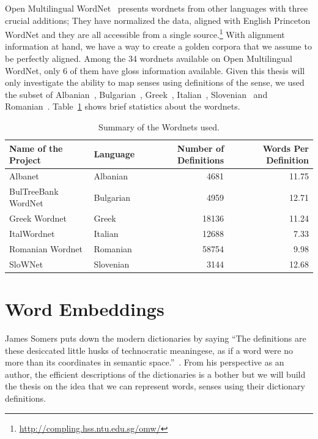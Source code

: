 Open Multilingual WordNet~\cite{bond_survey_2012} presents wordnets from other languages with three crucial additions; %
They have normalized the data, aligned with English Princeton WordNet and they are all accessible from a single source.\footnote{\url{http://compling.hss.ntu.edu.sg/omw/}}
With alignment information at hand, we have a way to create a golden corpora that we assume to be perfectly aligned.
Among the 34 wordnets available on Open Multilingual WordNet, only 6 of them have gloss information available.
Given this thesis will only investigate the ability to map senses using definitions of the sense, we used the subset of Albanian~\cite{ruci_current_2008}, Bulgarian~\cite{simov_constructing_2010}, Greek~\cite{stamou_exploring_2004}, Italian~\cite{pianta_multiwordnet_2002}, Slovenian~\cite{fiser_slownet_2012} and Romanian~\cite{tufis_romanian_2008}.
Table~\ref{tab:summary_table} shows brief statistics about the wordnets.

\begin{table}[!hbp]
    \begin{center}
        \caption{Summary of the Wordnets used.}\label{tab:summary_table}
        \begin{tabular}{llrr}
            \toprule%
            \textbf{Name of the Project} & \textbf{Language} & \textbf{Number of Definitions} & \textbf{Words Per Definition} \\
            \midrule%
            Albanet & Albanian & 4681 & 11.75 \\
            BulTreeBank WordNet & Bulgarian & 4959 & 12.71 \\
            Greek Wordnet & Greek & 18136 & 11.24 \\
            ItalWordnet & Italian & 12688 & 7.33 \\
            Romanian Wordnet & Romanian & 58754 & 9.98 \\
            SloWNet & Slovenian & 3144 & 12.68 \\
            \bottomrule %
        \end{tabular}
    \end{center}
\end{table}

\section{Word Embeddings}%
\label{sec:word_embeddings}
James Somers puts down the modern dictionaries by saying \enquote{The definitions are these desiccated little husks of technocratic meaningese, as if a word were no more than its coordinates in semantic space.}~\cite{somers_youre_2014}.
From his perspective as an author, the efficient descriptions of the dictionaries is a bother but we will build the thesis on the idea that we can represent words, senses using their dictionary definitions.

